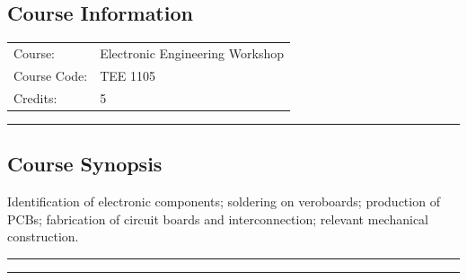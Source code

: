 
\subsection*{Course Information}
\vspace{0ex}%
\noindent\parbox{0.5\textwidth}{%
    \noindent\begin{tabular}{@{}ll}
                 \textsf{Course:}          & 	Electronic Engineering Workshop \\
                 \textsf{Course Code:}         & 	TEE 1105 \\
                 \textsf{Credits:}    & 	5
    \end{tabular}}
\vspace{2ex}\hrule\vspace{2ex}


\subsection*{Course Synopsis}
Identification of electronic components; soldering on veroboards; production of PCBs;
fabrication of circuit boards and interconnection; relevant mechanical construction.
\vspace{2ex}\hrule
\vspace{2ex}\hrule\vspace{2ex}